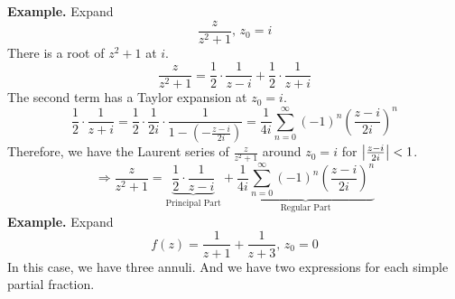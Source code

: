\documentclass[11pt]{article}
\DeclarePairedDelimiter\abs{\lvert}{\rvert}
\begin{document}
\textbf{Example.} Expand 
$$\frac{z}{z^2 + 1}, \, z_0 = i$$ 
There is a root of $z^2 + 1$ at $i$. 
$$\frac{z}{z^2 + 1} = \frac{1}{2}\cdot \frac{1}{z - i} + \frac{1}{2}\cdot \frac{1}{z + i}$$
The second term has a Taylor expansion at $z_0 = i$. 
$$\frac{1}{2}\cdot \frac{1}{z + i} = \frac{1}{2}\cdot \frac{1}{2i}\cdot \frac{1}{1-\left(-\frac{z-i}{2i}\right)} = \frac{1}{4i}\sum_{n = 0}^{\infty}(-1)^n\left(\frac{z - i}{2i}\right)^n $$
Therefore, we have the Laurent series of $\frac{z}{z^2 + 1}$ around $z_0 = i$ for $\abs*{\frac{z - i}{2i}} < 1$.
$$\Rightarrow \frac{z}{z^2 + 1} = {\underbrace{\frac{1}{2} \cdot \frac{1}{z - i}}_\text{Principal Part}} + {\underbrace{\frac{1}{4i}\sum_{n = 0}^{\infty}(-1)^n\left(\frac{z - i}{2i}\right)^n}_\text{Regular Part}}$$
\newline
\textbf{Example.} Expand 
$$ f(z) = \frac{1}{z + 1} + \frac{1}{z + 3}, \, z_0 = 0$$
In this case, we have three annuli. And we have two expressions for each simple partial fraction. 
\end{document}

